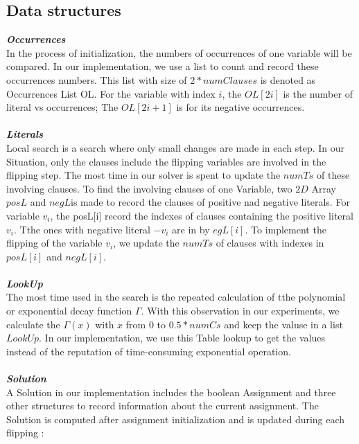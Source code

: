 \documentclass[12pt,a4paper,twoside]{scrartcl}
\numberwithin{equation}{section}
\begin{document}
\subsection{Data structures}
\label{subsec:Data structures}
\emph{\textbf{ Occurrences}}
\\
In the process of initialization, the numbers of occurrences of one variable will be compared. In our implementation, we use a list to count and record these occurrences numbers. This list with size of $2*numClauses $ is denoted as Occurrences List OL. For the variable with index $i$, the $OL[2i]$ is the number of literal vs occurrences; The $OL[2i+1]$ is for its negative occurrences. \\
\\
\emph{\textbf{ Literals}}
\\
Local search is a search where only small changes are made in each step. In our Situation, only the clauses include the flipping variables are involved in the flipping step. The most time in our solver is spent to update the $numTs$ of these involving clauses. To find the involving clauses of one Variable,  two $2D$ Array $posL$ and $negL$is made to record the clauses of positive nad negative literals. For variable $v_i $, the posL[i] record the indexes of clauses containing the positive literal $v_i$. Tthe ones with negative literal $-v_i$ are in by $egL[i]$. To implement the flipping of the variable $v_i$, we update the $numTs$ of clauses with indexes in $posL[i]$ and $negL[i]$.\\
\\
\emph{\textbf{LookUp}}
\\
The most time used in the search is the repeated  calculation  of  tthe polynomial or exponential decay function $\Gamma$. With this observation in our experiments, we calculate the $\Gamma(x)$ with $x$ from $0$ to $0.5* numCs$ and keep the valuse in a list $LookUp$. In our implementation, we use this Table lookup to get the values instead of the reputation of time-consuming exponential operation.  \\
\\
\emph{\textbf{Solution}}
\\
A Solution in our implementation includes the boolean Assignment and three other structures to record information about the current assignment. The Solution is computed after assignment initialization and is updated during each flipping :\\
\end{document}
